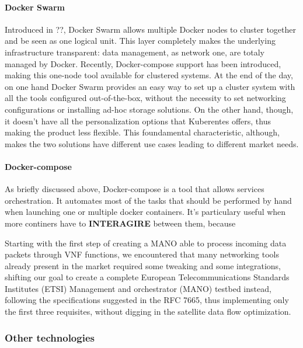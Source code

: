 \documentclass[10pt]{book}
\begin{document}
\paragraph{Docker Swarm} Introduced in ??, Docker Swarm allows multiple Docker nodes to cluster together and be
seen as one logical unit. This layer completely makes the underlying
infrastructure transparent: data management, as network one, are totaly managed
by Docker. Recently, Docker-compose support has been introduced, making
this one-node tool available for clustered systems. At the end of the day, on
one hand Docker Swarm provides an easy way to set up a cluster system with all
the tools configured out-of-the-box, without the necessity to set networking
configurations or installing ad-hoc storage solutions. On the other hand,
though, it doesn't have all the personalization options that Kuberentes offers,
thus making the product less flexible. This foundamental characteristic,
although, makes the two solutions have different use cases leading to different
market needs.

\paragraph{Docker-compose} As briefly discussed above, Docker-compose is a tool 
that allows services orchestration. It automates most of the tasks that should 
be performed by hand when launching one or multiple docker containers. It's 
particulary useful when more continers have to \textbf{INTERAGIRE} between them, because

\vspace{0.5cm}

Starting with the first step of creating a MANO able to process incoming data 
packets through VNF functions, we encountered that many networking tools 
already 
present in the market required some tweaking and some integrations, shifting 
our 
goal to create a complete  European Telecommunications Standards Institutes 
(ETSI) Management and orchestrator (MANO) testbed instead, following the 
specifications suggested in the RFC 7665, thus implementing only the first 
three 
requisites, without digging in the satellite data flow optimization.


\subsubsection{Other technologies}
\end{document}

